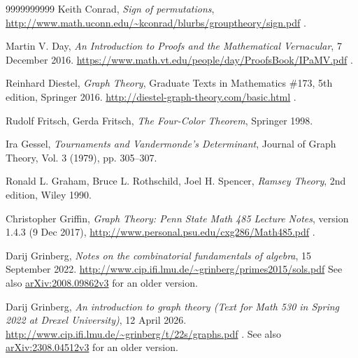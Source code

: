 \documentclass[numbers=enddot,12pt,final,onecolumn,notitlepage]{scrartcl}%
\theoremstyle{definition}
\begin{document}
\begin{thebibliography}{9999999999}
Keith Conrad, \textit{Sign of permutations},
\newline\url{http://www.math.uconn.edu/~kconrad/blurbs/grouptheory/sign.pdf} .

Martin V. Day,
\textit{An Introduction to Proofs and the Mathematical Vernacular},
7 December 2016.
\newline\url{https://www.math.vt.edu/people/day/ProofsBook/IPaMV.pdf} .


Reinhard Diestel, \textit{Graph Theory},
Graduate Texts in Mathematics \#173, 5th edition, Springer 2016.
\newline \url{http://diestel-graph-theory.com/basic.html} .

Rudolf Fritsch, Gerda Fritsch,
\textit{The Four-Color Theorem},
Springer 1998.

Ira Gessel, \textit{Tournaments and
Vandermonde's Determinant}, Journal of Graph Theory, Vol. 3 (1979), pp. 305--307.

Ronald L. Graham, Bruce L. Rothschild,
Joel H. Spencer, \textit{Ramsey Theory}, 2nd edition,
Wiley 1990.

Christopher Griffin,
\textit{Graph Theory: Penn State Math 485 Lecture Notes},
version 1.4.3 (9 Dec 2017),
\newline\url{http://www.personal.psu.edu/cxg286/Math485.pdf} .

Darij Grinberg, \textit{Notes on the combinatorial
fundamentals of algebra}, 15 September 2022.
\newline\url{http://www.cip.ifi.lmu.de/~grinberg/primes2015/sols.pdf}
\newline
See also \href{https://arxiv.org/abs/2008.09862v3}{arXiv:2008.09862v3}
for an older version.

Darij Grinberg, \textit{An introduction to graph theory
(Text for Math 530 in Spring 2022 at Drexel University)}, 12 April 2026.
\newline\url{http://www.cip.ifi.lmu.de/~grinberg/t/22s/graphs.pdf} .
\newline
See also \href{https://arxiv.org/abs/2308.04512v3}{arXiv:2308.04512v3}
for an older version.


\end{thebibliography}
\end{document}
